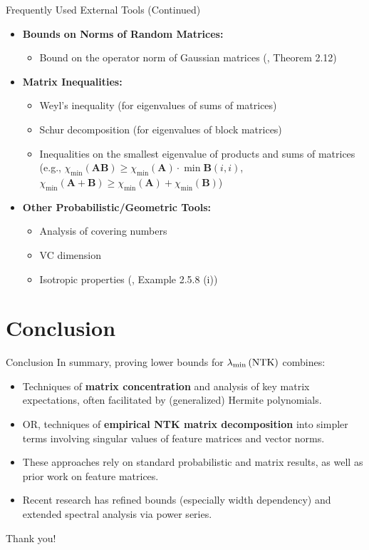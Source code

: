 \documentclass{beamer}
\newcommand{\evmin}[1]{\lambda_{\rm min}\left(#1\right)} %
\begin{document}
\begin{frame}{Frequently Used External Tools (Continued)}
  \begin{itemize}[<+->]
    \item \textbf{Bounds on Norms of Random Matrices:}
    \begin{itemize}
      \item Bound on the operator norm of Gaussian matrices (\cite{Davidson2001}, Theorem 2.12)
    \end{itemize}
    \item \textbf{Matrix Inequalities:}
    \begin{itemize}
      \item Weyl's inequality (for eigenvalues of sums of matrices)
      \item Schur decomposition (for eigenvalues of block matrices)
      \item Inequalities on the smallest eigenvalue of products and sums of matrices (e.g., $\chi_{\min}(\mathbf{AB}) \geq \chi_{\min}(\mathbf{A}) \cdot \min \mathbf{B}(i,i)$, $\chi_{\min}(\mathbf{A}+\mathbf{B}) \geq \chi_{\min}(\mathbf{A}) + \chi_{\min}(\mathbf{B})$)
    \end{itemize}
    \item \textbf{Other Probabilistic/Geometric Tools:}
    \begin{itemize}
      \item Analysis of covering numbers
      \item VC dimension
      \item Isotropic properties (\cite{vershynin_high-dimensional_2018}, Example 2.5.8 (i))
    \end{itemize}
  \end{itemize}
\end{frame}

\section{Conclusion}
\begin{frame}{Conclusion}
  In summary, proving lower bounds for $\evmin{\text{NTK}}$ combines:
  \begin{itemize}[<+->]
    \item Techniques of \textbf{matrix concentration} and analysis of key matrix expectations, often facilitated by (generalized) Hermite polynomials.
    \item OR, techniques of \textbf{empirical NTK matrix decomposition} into simpler terms involving singular values of feature matrices and vector norms.
    \item These approaches rely on standard probabilistic and matrix results, as well as prior work on feature matrices.
    \item Recent research has refined bounds (especially width dependency) and extended spectral analysis via power series.
  \end{itemize}
\end{frame}

\begin{frame}
  \begin{center}
    Thank you!
  \end{center}
\end{frame}
\end{document}
